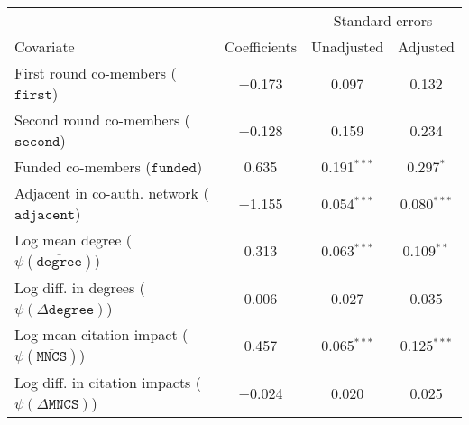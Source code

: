 \begin{tabular}{lccc}
\toprule
& & \multicolumn{2}{c}{Standard errors}\\
\cmidrule(lr){3-4}
Covariate & Coefficients & Unadjusted & Adjusted\\
\midrule
First round co-members ($\mathtt{first}$) & $-$0.173 & 0.097 & 0.132\\
Second round co-members ($\mathtt{second}$) & $-$0.128 & 0.159 & 0.234\\
Funded co-members ($\mathtt{funded}$) & 0.635 & 0.191$^{***}$ & 0.297$^*$\\
Adjacent in co-auth. network ($\mathtt{adjacent}$) & $-$1.155 & 0.054$^{***}$ & 0.080$^{***}$\\
Log mean degree ($\psi(\overline{\mathtt{degree}})$) & 0.313 & 0.063$^{***}$ & 0.109$^{**}$\\
Log diff. in degrees ($\psi(\Delta \mathtt{degree})$) & 0.006 & 0.027 & 0.035\\
Log mean citation impact ($\psi(\overline{\mathtt{MNCS}})$) & 0.457 & 0.065$^{***}$ & 0.125$^{***}$\\
Log diff. in citation impacts ($\psi(\Delta\mathtt{MNCS})$) & $-$0.024 & 0.020 & 0.025\\
\bottomrule
\end{tabular}
